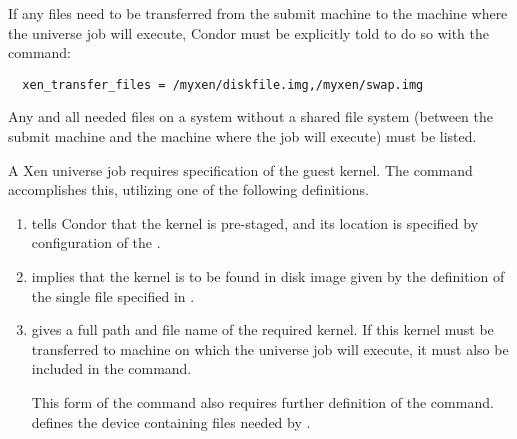 If any files need to be transferred from the submit machine
to the machine where the  universe job will execute, 
Condor must be explicitly told to do so with the 
 command:
\footnotesize
\begin{verbatim}
  xen_transfer_files = /myxen/diskfile.img,/myxen/swap.img
\end{verbatim}
\normalsize
Any and all needed files on a system without a shared file
system (between the submit machine and the machine where the
job will execute) must be listed.

A Xen  universe job requires specification of the
guest kernel. 
The  command accomplishes this, 
utilizing one of the following definitions.
\begin{enumerate}
\item {}
  tells Condor that the kernel is pre-staged, and its location is
  specified by configuration of the .

\item {} implies that the kernel
  is to be found in disk image given by the definition of the single file
  specified in . 



\item {} gives a full path and
  file name of the required kernel.  If this kernel must be transferred
  to machine on which the  universe job will execute,
  it must also be included in the  command. 

  This form of the  command also requires further
  definition of the  command.
   defines the device containing files needed by
  .

\end{enumerate}

